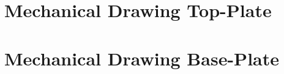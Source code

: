 \section{Mechanical Drawing Top-Plate}
\enlargethispage{2.5cm}
\begin{adjustwidth}{0.23cm}{0cm} \hfuzz=7.0pt \vfuzz=20.0pt
\end{adjustwidth}
\newpage

\section{Mechanical Drawing Base-Plate}
\enlargethispage{2.5cm}
\begin{adjustwidth}{-0.23cm}{0cm} \hfuzz=7.0pt \vfuzz=20.0pt
\end{adjustwidth}
\newpage

